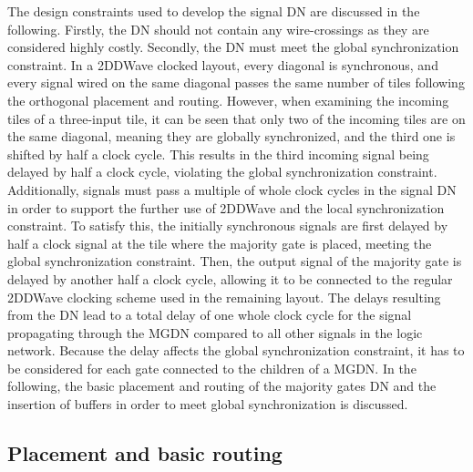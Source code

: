The design constraints used to develop the signal DN are discussed in the following. Firstly, the DN should not contain any wire-crossings as they are considered highly costly. Secondly, the DN must meet the global synchronization constraint. In a 2DDWave clocked layout, every diagonal is synchronous, and every signal wired on the same diagonal passes the same number of tiles following the orthogonal placement and routing. However, when examining the incoming tiles of a three-input tile, it can be seen that only two of the incoming tiles are on the same diagonal, meaning they are globally synchronized, and the third one is shifted by half a clock cycle. This results in the third incoming signal being delayed by half a clock cycle, violating the global synchronization constraint. Additionally, signals must pass a multiple of whole clock cycles in the signal DN in order to support the further use of 2DDWave and the local synchronization constraint. To satisfy this, the initially synchronous signals are first delayed by half a clock signal at the tile where the majority gate is placed, meeting the global synchronization constraint. Then, the output signal of the majority gate is delayed by another half a clock cycle, allowing it to be connected to the regular 2DDWave clocking scheme used in the remaining layout. The delays resulting from the DN lead to a total delay of one whole clock cycle for the signal propagating through the MGDN compared to all other signals in the logic network. Because the delay affects the global synchronization constraint, it has to be considered for each gate connected to the children of a MGDN. In the following, the basic placement and routing of the majority gates DN and the insertion of buffers in order to meet global synchronization is discussed.

\subsection{Placement and basic routing}

